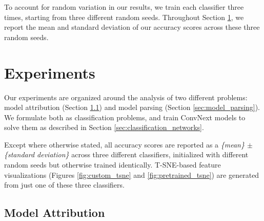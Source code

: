 \documentclass[10pt]{article} %
\begin{document}
To account for random variation in our results, we train each classifier three times, starting from three different random seeds. Throughout Section \ref{sec:experiments}, we report the mean and standard deviation of our accuracy scores across these three random seeds.

\section{Experiments}
\label{sec:experiments}

Our experiments are organized around the analysis of two different problems: model attribution (Section \ref{sec:model_attribution}) and model parsing (Section \ref{sec:model_parsing}). We formulate both as classification problems, and train ConvNext models to solve them as described in Section \ref{sec:classification_networks}. 

Except where otherwise stated, all accuracy scores are reported as a \textit{\{mean\} $\pm$ \{standard deviation\}} across three different classifiers, initialized with different random seeds but otherwise trained identically. T-SNE-based feature visualizations (Figures \ref{fig:custom_tsne} and \ref{fig:pretrained_tsne}) are generated from just one of these three classifiers.

\subsection{Model Attribution}
\label{sec:model_attribution}

\newcommand{\STAB}[1]{\begin{tabular}{@{}c@{}}#1\end{tabular}}
\end{document}
